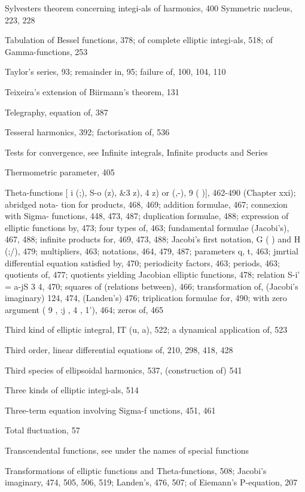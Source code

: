 Sylvesters theorem concerning integi-als of harmonics, 400
Symmetric nucleus, 223, 228

Tabulation of Bessel functions, 378; of complete elliptic integi-als, 518; of Gamma-functions, 253

Taylor's series, 93; remainder in, 95; failure of, 100, 104, 110

Teixeira's extension of Biirmann's theorem, 131

Telegraphy, equation of, 387

Tesseral harmonics, 392; factorisation of, 536

Tests for convergence, see Infinite integrals, Infinite products and Series

Thermometric parameter, 405

Theta-functions [ i (;), S-o (z), \&3  z),  4  z) or   (,-), 9 ( )], 462-490 (Chapter xxi); abridged nota-
tion for products, 468, 469; addition formulae, 467; connexion with Sigma- functions, 448,
473, 487; duplication formulae, 488; expression of elliptic functions by, 473; four types
of, 463; fundamental formulae (Jacobi's), 467, 488; infinite products for, 469, 473, 488;
Jacobi's first notation, G ( ) and H (;/), 479; multipliers, 463; notations, 464, 479, 487;
parameters q, t, 463; jmrtial differential equation satisfied by, 470; periodicity factors,
463; periods, 463; quotients of, 477; quotients yielding Jacobian elliptic functions, 478;
relation S-i' = a-jS 3  4, 470; squares of (relations between), 466; transformation of, (Jacobi's
imaginary) 124, 474, (Landen's) 476; triplication formulae for, 490; with zero argument
( 9 ,  :j ,  4 ,  1'), 464; zeros of, 465

Third kind of elliptic integral, IT (u, a), 522; a dynamical application of, 523

Third order, linear differential equations of, 210, 298, 418, 428

Third species of ellipsoidal harmonics, 537, (construction of) 541

Three kinds of elliptic integi-als, 514

Three-term equation involving Sigma-f unctions, 451, 461

Total fluctuation, 57

Transcendental functions, see under the names of special functions

Transformations of elliptic functions and Theta-functions, 508; Jacobi's imaginary, 474, 505,
506, 519; Landen's, 476, 507; of Eiemann's P-equation, 207

